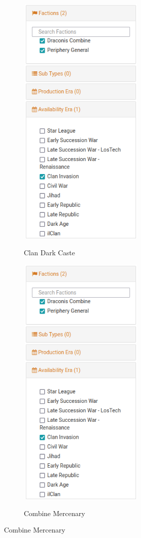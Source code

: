 {
\begin{figure}[!h]
  \begin{center}
  \begin{subfigure}{0.4\textwidth}
    \centering
    \includegraphics[alt='Clan Dark Caste Faction list', height=4.9in, width=2.4in]{img/Dark-Caste-List.png}
    \caption*{Clan Dark Caste}
  \end{subfigure}
  \hspace{1in}
  \begin{subfigure}{0.4\textwidth}
    \centering
    \includegraphics[alt='Combine Mercenary Faction list', height=4.9in, width=2.4in]{img/Combine-Mercenary-List.png}
    \caption*{Combine Mercenary}
  \end{subfigure}
  \end{center}
\end{figure}
}
